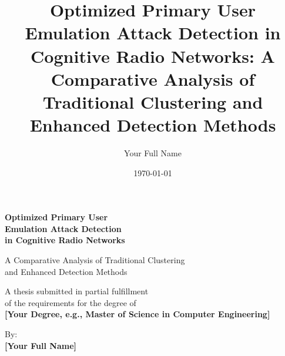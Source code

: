 \documentclass[12pt,a4paper,twoside]{report}
\title{Optimized Primary User Emulation Attack Detection in Cognitive Radio Networks: A Comparative Analysis of Traditional Clustering and Enhanced Detection Methods}
\author{Your Full Name}
\date{\today}
\theoremstyle{mytheoremstyle}
\begin{document}
\frontmatter

\begin{titlepage}
    \begin{center}
        \vspace*{0.5cm}
        
        
        \vspace{1cm}
        
        \Huge
        \textcolor{chaptercolor}{\textbf{Optimized Primary User}}\\[0.3cm]
        \Huge
        \textcolor{chaptercolor}{\textbf{Emulation Attack Detection}}\\[0.3cm]
        \Huge
        \textcolor{chaptercolor}{\textbf{in Cognitive Radio Networks}}
        
        \vspace{0.5cm}
        
        \Large
        A Comparative Analysis of Traditional Clustering\\
        and Enhanced Detection Methods
        
        \vspace{1.5cm}
        
        
        \vspace{1cm}
        
        \Large
        A thesis submitted in partial fulfillment\\
        of the requirements for the degree of\\
        \textbf{[Your Degree, e.g., Master of Science in Computer Engineering]}
        
        \vspace{1.5cm}
        
        \Large
        By:\\
        \textbf{[Your Full Name]}
        
        \vfill
        
        

\end{center}
\end{titlepage}
\end{document}
